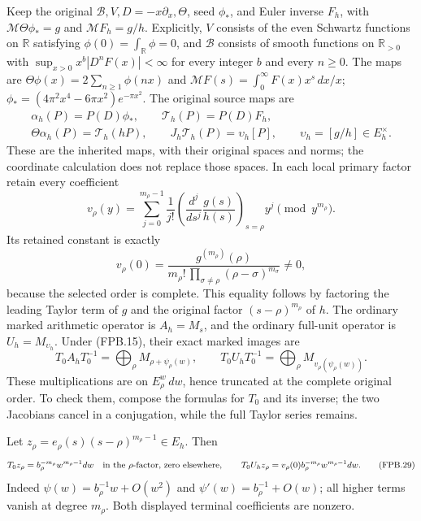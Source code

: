 Keep the original \(\mathscr B,V,D=-x\partial_x,\Theta\), seed
\(\phi_*\), and Euler inverse \(F_h\), with
\(\mathcal M\Theta\phi_*=g\) and \(\mathcal M F_h=g/h\).
Explicitly, \(V\) consists of the even Schwartz functions on
\(\mathbb{R}\) satisfying \(\phi(0)=\int_{\mathbb{R}}\phi=0\),
and \(\mathscr B\) consists of smooth functions on
\(\mathbb{R}_{>0}\) with
\(\sup_{x>0}x^b|D^nF(x)|<\infty\) for every integer \(b\)
and every \(n\ge0\). The maps are
\(\Theta\phi(x)=2\sum_{n\ge1}\phi(nx)\) and
\(\mathcal MF(s)=\int_0^\infty F(x)x^s\,dx/x\);
\(\phi_*=(4\pi^2x^4-6\pi x^2)e^{-\pi x^2}\).
The original source maps are
\[
 \begin{gathered}
 \alpha_h(P)=P(D)\phi_*,\qquad
 \mathcal T_h(P)=P(D)F_h,\\
 \Theta\alpha_h(P)=\mathcal T_h(hP),\qquad
 J_h\mathcal T_h(P)=\upsilon_h[P],
 \qquad \upsilon_h=[g/h]\in E_h^\times.
 \end{gathered}
 \tag{FPB.26}\label{eq:fpb-theta}
\]
These are the inherited maps, with their original spaces and norms;
the coordinate calculation does not replace those spaces. In each
local primary factor retain every coefficient
\[
 v_\rho(y)=\sum_{j=0}^{m_\rho-1}
    \frac1{j!}\left(\frac{d^j}{ds^j}\frac{g(s)}{h(s)}
             \right)_{s=\rho}y^j\pmod {y^{m_\rho}}.
 \tag{FPB.27}\label{eq:fpb-unit}
\]
Its retained constant is exactly
\[
 v_\rho(0)=\frac{g^{(m_\rho)}(\rho)}
  {m_\rho!\,\prod_{\sigma\ne\rho}(\rho-\sigma)^{m_\sigma}}
  \ne0,
\]
because the selected order is complete. This equality follows by
factoring the leading Taylor term of \(g\) and the original factor
\((s-\rho)^{m_\rho}\) of \(h\).
The ordinary marked arithmetic operator is \(A_h=M_s\), and
the ordinary full-unit operator is \(U_h=M_{\upsilon_h}\).
Under (FPB.15), their exact marked images are
\[
 T_0A_hT_0^{-1}=\bigoplus_\rho M_{\rho+\psi_\rho(w)},\qquad
 T_0U_hT_0^{-1}=\bigoplus_\rho M_{v_\rho(\psi_\rho(w))}.
 \tag{FPB.28}\label{eq:fpb-marked-arithmetic}
\]
These multiplications are on \(E_\rho^w\,dw\), hence truncated
at the complete original order. To check them, compose the formulas
for \(T_0\) and its inverse; the two Jacobians cancel in a
conjugation, while the full Taylor series remains.

Let \(z_\rho=e_\rho(s)(s-\rho)^{m_\rho-1}\in E_h\). Then
\[
 T_0z_\rho=b_\rho^{-m_\rho}w^{m_\rho-1}dw
       \quad\hbox{in the \(\rho\)-factor, zero elsewhere},
 \qquad
 T_0U_hz_\rho=v_\rho(0)b_\rho^{-m_\rho}
                       w^{m_\rho-1}dw.
 \tag{FPB.29}\label{eq:fpb-terminal}
\]
Indeed \(\psi(w)=b_\rho^{-1}w+O(w^2)\) and
\(\psi'(w)=b_\rho^{-1}+O(w)\); all higher terms vanish at
degree \(m_\rho\). Both displayed terminal coefficients are nonzero.

